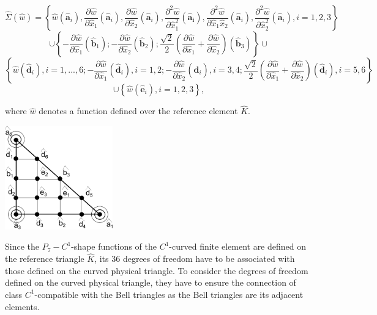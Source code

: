\[ \hat{\Sigma}(\hat{w}) = \left\{\hat{w}(\mathbf{\hat{a}}_{i}), \frac{\partial \hat{w}}{\partial \hat{x}_{1}}(\mathbf{\hat{a}}_{i}), \frac{\partial \hat{w}}{\partial \hat{x}_{2}}(\mathbf{\hat{a}}_{i}), \frac{\partial^2 \hat{w}}{\partial \hat{x}^2_{1}}(\mathbf{\hat{a}_{i}}), \frac{\partial^2 \hat{w}}{\partial \hat{x}_{1}\hat{x}_{2}}(\mathbf{\hat{a}}_{i}), \frac{\partial^2 \hat{w}}{\partial \hat{x}^2_{2}}(\mathbf{\hat{a}}_{i}), i=1,2,3 \right\} \] \[ \cup \left\{ -\frac{\partial \hat{w}}{\partial \hat{x}_{1}}(\mathbf{\hat{b}}_{1}); -\frac{\partial \hat{w}}{\partial \hat{x}_{2}}(\mathbf{\hat{b}}_{2}); \frac{\sqrt{2}}{2}\left(\frac{\partial \hat{w}}{\partial \hat{x}_{1}}+\frac{\partial \hat{w}}{\partial \hat{x}_{2}}\right)(\mathbf{\hat{b}}_{3}) \right\} \cup \] \[ \left\{ \hat{w}(\mathbf{\hat{d}}_{i}),i=1,...,6; -\frac{\partial \hat{w}}{\partial \hat{x}_{1}}(\mathbf{\hat{d}}_{i}), i=1,2; -\frac{\partial \hat{w}}{\partial \hat{x}_{2}}(\mathbf{\hat{d}}_{i}), i=3,4; \frac{\sqrt{2}}{2}\left(\frac{\partial \hat{w}}{\partial \hat{x}_{1}} + \frac{\partial \hat{w}}{\partial \hat{x}_{2}}\right)(\mathbf{\hat{d}}_{i}), i=5,6 \right\} \] \[ \cup \left\{ \hat{w}(\mathbf{\hat{e}}_{i}),i=1,2,3 \right\}, \]

where $\hat{w}$ denotes a function defined over the reference element $\hat{K}.$

 
\begin{DoxyImage}
\includegraphics[width=0.35\textwidth]{Triple_of_FE}
\end{DoxyImage}


Since the $ P_7-C^1 $-\/shape functions of the $ C^1 $-\/curved finite element are defined on the reference triangle $ \hat{K} $, its 36 degrees of freedom have to be associated with those defined on the curved physical triangle. To consider the degrees of freedom defined on the curved physical triangle, they have to ensure the connection of class $ C^1 $-\/compatible with the Bell triangles as the Bell triangles are its adjacent elements.

